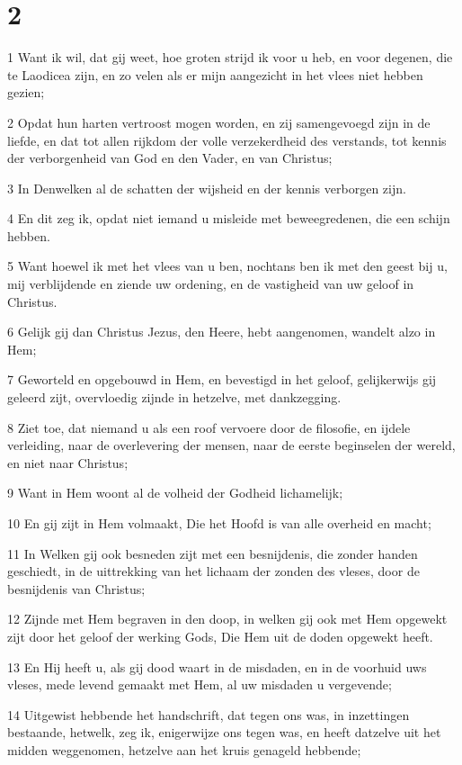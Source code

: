 \chapter{2}

\par 1 Want ik wil, dat gij weet, hoe groten strijd ik voor u heb, en voor degenen, die te Laodicea zijn, en zo velen als er mijn aangezicht in het vlees niet hebben gezien;
\par 2 Opdat hun harten vertroost mogen worden, en zij samengevoegd zijn in de liefde, en dat tot allen rijkdom der volle verzekerdheid des verstands, tot kennis der verborgenheid van God en den Vader, en van Christus;
\par 3 In Denwelken al de schatten der wijsheid en der kennis verborgen zijn.
\par 4 En dit zeg ik, opdat niet iemand u misleide met beweegredenen, die een schijn hebben.
\par 5 Want hoewel ik met het vlees van u ben, nochtans ben ik met den geest bij u, mij verblijdende en ziende uw ordening, en de vastigheid van uw geloof in Christus.
\par 6 Gelijk gij dan Christus Jezus, den Heere, hebt aangenomen, wandelt alzo in Hem;
\par 7 Geworteld en opgebouwd in Hem, en bevestigd in het geloof, gelijkerwijs gij geleerd zijt, overvloedig zijnde in hetzelve, met dankzegging.
\par 8 Ziet toe, dat niemand u als een roof vervoere door de filosofie, en ijdele verleiding, naar de overlevering der mensen, naar de eerste beginselen der wereld, en niet naar Christus;
\par 9 Want in Hem woont al de volheid der Godheid lichamelijk;
\par 10 En gij zijt in Hem volmaakt, Die het Hoofd is van alle overheid en macht;
\par 11 In Welken gij ook besneden zijt met een besnijdenis, die zonder handen geschiedt, in de uittrekking van het lichaam der zonden des vleses, door de besnijdenis van Christus;
\par 12 Zijnde met Hem begraven in den doop, in welken gij ook met Hem opgewekt zijt door het geloof der werking Gods, Die Hem uit de doden opgewekt heeft.
\par 13 En Hij heeft u, als gij dood waart in de misdaden, en in de voorhuid uws vleses, mede levend gemaakt met Hem, al uw misdaden u vergevende;
\par 14 Uitgewist hebbende het handschrift, dat tegen ons was, in inzettingen bestaande, hetwelk, zeg ik, enigerwijze ons tegen was, en heeft datzelve uit het midden weggenomen, hetzelve aan het kruis genageld hebbende;
